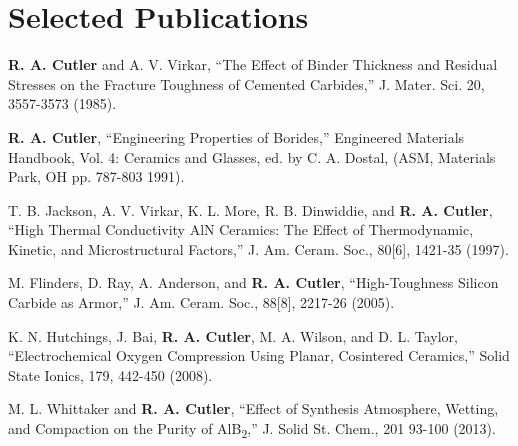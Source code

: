 \documentclass[letterpaper]{deedy-resume} %
\begin{document}
\newpage

\section{Selected Publications}

\begin{tightitemize}
\vspace{\topsep} %
\item \textbf{R. A. Cutler} and A. V. Virkar, ``The Effect of Binder
  Thickness and Residual Stresses on the Fracture Toughness of
  Cemented Carbides,'' J. Mater. Sci. 20, 3557-3573 (1985).
\item \textbf{R. A. Cutler}, ``Engineering Properties of Borides,''
  Engineered Materials Handbook, Vol. 4: Ceramics and Glasses, ed. by
  C. A. Dostal, (ASM, Materials Park, OH pp. 787-803 1991).
\item T. B. Jackson, A. V. Virkar, K. L. More, R. B. Dinwiddie, and
  \textbf{R. A. Cutler}, ``High Thermal Conductivity AlN Ceramics: The
  Effect of Thermodynamic, Kinetic, and Microstructural Factors,''
  J. Am.  Ceram. Soc., 80[6], 1421-35 (1997).
\item M. Flinders, D. Ray, A. Anderson, and \textbf{R. A. Cutler},
  ``High-Toughness Silicon Carbide as Armor,'' J. Am. Ceram. Soc.,
  88[8], 2217-26 (2005).
\item K. N. Hutchings, J. Bai, \textbf{R. A. Cutler}, M. A. Wilson,
  and D. L. Taylor, ``Electrochemical Oxygen Compression Using Planar,
  Cosintered Ceramics,'' Solid State Ionics, 179, 442-450 (2008).
\item M. L. Whittaker and \textbf{R. A. Cutler}, ``Effect of Synthesis
  Atmosphere, Wetting, and Compaction on the Purity of AlB\textsubscript{2},''
  J. Solid St. Chem., 201 93-100 (2013).
\end{tightitemize}

\sectionspace
\sectionspace
\sectionspace
\sectionspace
\end{document}
